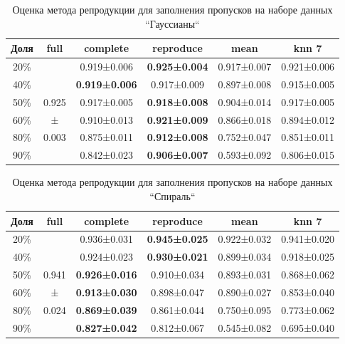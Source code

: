 \begin{table} [htbp]
    \centering
    \begin{threeparttable}
        \caption{Оценка метода репродукции для заполнения пропусков на наборе данных ``Гауссианы``}\label{tab:missing_results_gaussians}
        \begin{SingleSpace}
        \begin{tabular}{|c|c|c|c|c|c|}
            \hline
            Доля & full & complete & reproduce & mean & knn 7 \\
            \hline
            20\% &       & 0.919±0.006 & \textbf{0.925±0.004} & 0.917±0.007 & 0.921±0.006 \\
            40\% &       & \textbf{0.919±0.006} & 0.917±0.009 & 0.897±0.008 & 0.915±0.005 \\
            50\% & 0.925 & 0.917±0.005 & \textbf{0.918±0.008} & 0.904±0.014 & 0.917±0.005 \\
            60\% &   ±   & 0.910±0.013 & \textbf{0.921±0.009} & 0.866±0.018 & 0.894±0.012 \\
            80\% & 0.003 & 0.875±0.011 & \textbf{0.912±0.008} & 0.752±0.047 & 0.851±0.011 \\
            90\% &       & 0.842±0.023 & \textbf{0.906±0.007} & 0.593±0.092 & 0.806±0.015 \\
            \hline
        \end{tabular}
        \end{SingleSpace}
    \end{threeparttable}
\end{table}


\begin{table} [htbp]
    \centering
    \begin{threeparttable}
        \caption{Оценка метода репродукции для заполнения пропусков на наборе данных ``Спираль``}\label{tab:missing_results_spiral}
        \begin{SingleSpace}
        \begin{tabular}{|c|c|c|c|c|c|}
            \hline
            Доля & full & complete & reproduce & mean & knn 7 \\
            \hline
            20\% &       & 0.936±0.031 & \textbf{0.945±0.025} & 0.922±0.032 & 0.941±0.020 \\
            40\% &       & 0.924±0.023 & \textbf{0.930±0.021} & 0.899±0.034 & 0.918±0.025 \\
            50\% & 0.941 & \textbf{0.926±0.016} & 0.910±0.034 & 0.893±0.031 & 0.868±0.062 \\
            60\% &   ±   & \textbf{0.913±0.030} & 0.898±0.047 & 0.890±0.027 & 0.853±0.040 \\
            80\% & 0.024 & \textbf{0.869±0.039} & 0.861±0.044 & 0.750±0.095 & 0.773±0.062 \\
            90\% &       & \textbf{0.827±0.042} & 0.812±0.067 & 0.545±0.082 & 0.695±0.040 \\
            \hline
        \end{tabular}
        \end{SingleSpace}
    \end{threeparttable}
\end{table}

